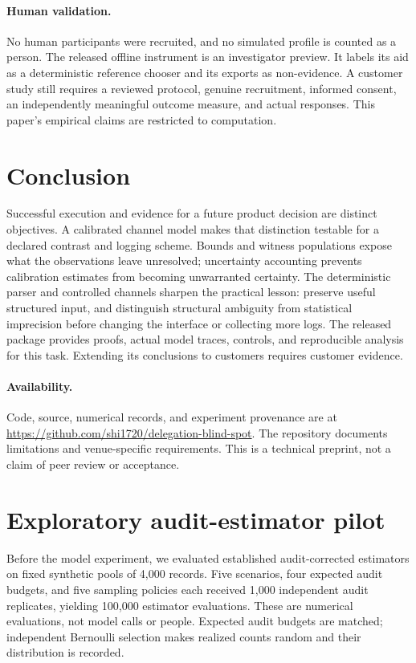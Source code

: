 \documentclass[10pt,twocolumn]{article}
\theoremstyle{definition}\newtheorem{definition}[theorem]{Definition}
\newcommand{\1}{\mathbf 1}
\begin{document}
\paragraph{Human validation.} No human participants were recruited, and no simulated profile is counted as a person. The released offline instrument is an investigator preview. It labels its aid as a deterministic reference chooser and its exports as non-evidence. A customer study still requires a reviewed protocol, genuine recruitment, informed consent, an independently meaningful outcome measure, and actual responses. This paper's empirical claims are restricted to computation.

\section{Conclusion}
Successful execution and evidence for a future product decision are distinct objectives. A calibrated channel model makes that distinction testable for a declared contrast and logging scheme. Bounds and witness populations expose what the observations leave unresolved; uncertainty accounting prevents calibration estimates from becoming unwarranted certainty. The deterministic parser and controlled channels sharpen the practical lesson: preserve useful structured input, and distinguish structural ambiguity from statistical imprecision before changing the interface or collecting more logs. The released package provides proofs, actual model traces, controls, and reproducible analysis for this task. Extending its conclusions to customers requires customer evidence.

\paragraph{Availability.} Code, source, numerical records, and experiment provenance are at \url{https://github.com/shi1720/delegation-blind-spot}. The repository documents limitations and venue-specific requirements. This is a technical preprint, not a claim of peer review or acceptance.
\begingroup\raggedright\small


\endgroup
\clearpage
\appendix
\onecolumn

\section{Exploratory audit-estimator pilot}\label{sec:pilot}
Before the model experiment, we evaluated established audit-corrected estimators on fixed synthetic pools of 4,000 records. Five scenarios, four expected audit budgets, and five sampling policies each received 1,000 independent audit replicates, yielding 100,000 estimator evaluations. These are numerical evaluations, not model calls or people. Expected audit budgets are matched; independent Bernoulli selection makes realized counts random and their distribution is recorded.
\end{document}
